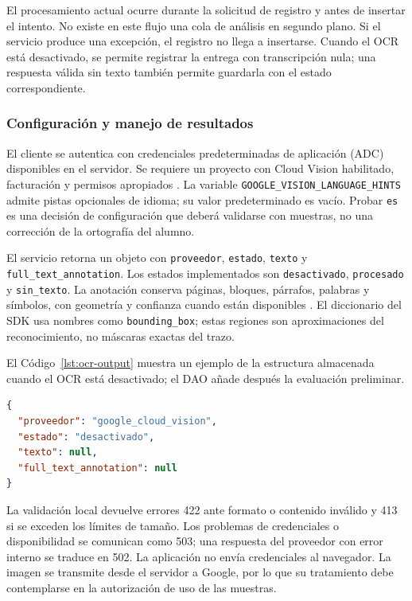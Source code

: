 El procesamiento actual ocurre durante la solicitud de registro y antes de insertar el intento. No existe en este flujo una cola de análisis en segundo plano. Si el servicio produce una excepción, el registro no llega a insertarse. Cuando el OCR está desactivado, se permite registrar la entrega con transcripción nula; una respuesta válida sin texto también permite guardarla con el estado correspondiente.

\subsubsection{Configuración y manejo de resultados}
El cliente se autentica con credenciales predeterminadas de aplicación (ADC) disponibles en el servidor. Se requiere un proyecto con Cloud Vision habilitado, facturación y permisos apropiados \cite{googlevisionSetup}. La variable \texttt{GOOGLE\_VISION\_LANGUAGE\_HINTS} admite pistas opcionales de idioma; su valor predeterminado es vacío. Probar \texttt{es} es una decisión de configuración que deberá validarse con muestras, no una corrección de la ortografía del alumno.

El servicio retorna un objeto con \texttt{proveedor}, \texttt{estado}, \texttt{texto} y \texttt{full\_text\_annotation}. Los estados implementados son \texttt{desactivado}, \texttt{procesado} y \texttt{sin\_texto}. La anotación conserva páginas, bloques, párrafos, palabras y símbolos, con geometría y confianza cuando están disponibles \cite{googlevisionAnnotation}. El diccionario del SDK usa nombres como \texttt{bounding\_box}; estas regiones son aproximaciones del reconocimiento, no máscaras exactas del trazo.

El Código~\ref{lst:ocr-output} muestra un ejemplo de la estructura almacenada cuando el OCR está desactivado; el DAO añade después la evaluación preliminar.
\begin{lstlisting}[language=JSON, caption={Contrato del servicio OCR: ejemplo con reconocimiento desactivado}, label={lst:ocr-output}]
{
  "proveedor": "google_cloud_vision",
  "estado": "desactivado",
  "texto": null,
  "full_text_annotation": null
}
\end{lstlisting}

La validación local devuelve errores 422 ante formato o contenido inválido y 413 si se exceden los límites de tamaño. Los problemas de credenciales o disponibilidad se comunican como 503; una respuesta del proveedor con error interno se traduce en 502. La aplicación no envía credenciales al navegador. La imagen se transmite desde el servidor a Google, por lo que su tratamiento debe contemplarse en la autorización de uso de las muestras.

